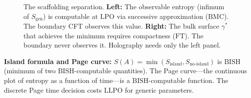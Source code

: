 \documentclass[11pt,a4paper]{report}
\theoremstyle{plain}
\theoremstyle{definition}
\theoremstyle{remark}
\newcommand{\BISH}{\mathrm{BISH}}
\newcommand{\LLPO}{\mathrm{LLPO}}
\newcommand{\LPO}{\mathrm{LPO}}
\newcommand{\BMC}{\mathrm{BMC}}
\newcommand{\FT}{\mathrm{FT}}
\begin{document}
\begin{figure}[ht]
\caption{The scaffolding separation. \textbf{Left:} The observable entropy (infimum of $S_{\mathrm{gen}}$) is computable at $\LPO$ via successive approximation ($\BMC$). The boundary CFT observes this value. \textbf{Right:} The bulk surface $\gamma^*$ that achieves the minimum requires compactness ($\FT$). The boundary never observes it. Holography needs only the left panel.}
\label{fig:scaffolding-sep}
\end{figure}

\textbf{Island formula and Page curve:} $S(A) = \min(S_{\mathrm{island}}, S_{\mathrm{no\text{-}island}})$ is $\BISH$ (minimum of two $\BISH$-computable quantities). The Page curve---the continuous plot of entropy as a function of time---is a $\BISH$-computable function. The discrete Page time decision costs $\LLPO$ for generic parameters.
\end{document}
